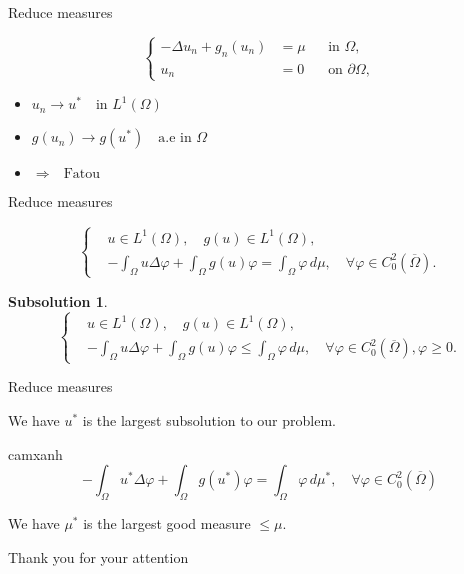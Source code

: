 \documentclass{beamer}
\begin{document}
\begin{frame}{Reduce measures}
\begin{thm}
\[
\left\{
\begin{aligned}
-\Delta u_n + g_n(u_n) & = \mu && \text{in } \Omega , \\
u_n & = 0 && \text{on } \partial \Omega ,
\end{aligned}
\right.
\]
\end{thm}
\bigskip
\begin{thm}
\begin{itemize}
\item $u_n \to u^* \quad\text{in }L^1(\Omega)$
\item $g(u_n) \to g(u^*) \quad\text{a.e in }\Omega$
\item $\Rightarrow \quad\text{Fatou}$
\end{itemize}
\end{thm}
\end{frame}

\begin{frame}{Reduce measures}
\begin{weak}
\[
\left\{
\begin{aligned}
& u \in L^1(\Omega ),\quad g(u) \in L^1(\Omega ) ,\\
&-\int_{\Omega} u \Delta \varphi + \int_{\Omega} g(u)\varphi = \int_{\Omega}\varphi\,d\mu, \quad \forall \varphi \in C^2_0(\overline{\Omega}) .
\end{aligned}
\right.
\]
\end{weak}
\bigskip
\newtheorem*{wss}{Subsolution}
\begin{wss}
\[
\left\{
\begin{aligned}
& u \in L^1(\Omega ),\quad g(u) \in L^1(\Omega ) ,\\
&-\int_{\Omega} u \Delta \varphi + \int_{\Omega} g(u)\varphi \leq \int_{\Omega}\varphi\,d\mu, \quad \forall \varphi \in C^2_0(\overline{\Omega}),\varphi \geq 0 .
\end{aligned}
\right.
\]
\end{wss}
\end{frame}

\begin{frame}{Reduce measures}
\begin{theorem}[1]
We have $u^*$ is the largest subsolution to our problem.
\end{theorem}
\bigskip
\begin{beamercolorbox}{camxanh}
\[-\int_{\Omega} u^* \Delta \varphi + \int_{\Omega} g(u^*)\varphi = \int_{\Omega}\varphi\,d\mu^*, \quad \forall \varphi \in C^2_0(\overline{\Omega})\]
\end{beamercolorbox}
\bigskip
\begin{theorem}[2]
We have $\mu^*$ is the largest good measure $\leq \mu$.
\end{theorem}
\end{frame}

\begin{frame}
\vspace{56pt}
\begin{center}
Thank you for your attention
\end{center}

\end{frame}
\end{document}
